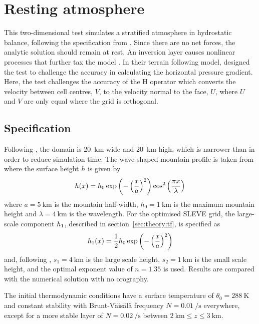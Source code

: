 \section{Resting atmosphere}
\label{sec:resting}

This two-dimensional test simulates a stratified atmosphere in hydrostatic balance, following the specification from \textcite{klemp2011}.  Since there are no net forces, the analytic solution should remain at rest.  An inversion layer causes nonlinear processes that further tax the model \autocite{good2013}.  In their terrain following model, \textcite{klemp2011} designed the test to challenge the accuracy in calculating the horizontal pressure gradient.  Here, the test challenges the accuracy of the H operator which converts the velocity between cell centres, $V$, to the velocity normal to the face, $U$, where $U$ and $V$ are only equal where the grid is orthogonal.

\subsection{Specification}
Following \textcite{weller-shahrokhi2014}, the domain is \SI{20}{\kilo\meter} wide and \SI{20}{\kilo\meter} high, which is narrower than \textcite{klemp2011} in order to reduce simulation time.  The wave-shaped mountain profile is taken from \textcite{schaer2002} where the surface height $h$ is given by
\begin{align}
	h(x) = h_0 \exp \left( - \left( \frac{x}{a} \right)^2 \right) \cos^2 \left( \frac{\pi x}{\lambda} \right) \label{eqn:resting:mountain}
\end{align}
where $a = \SI{5}{\kilo\meter}$ is the mountain half-width, $h_0 = \SI{1}{\kilo\meter}$ is the maximum mountain height and $\lambda = \SI{4}{\kilo\meter}$ is the wavelength.  For the optimised SLEVE grid, the large-scale component $h_1$, described in section~\ref{sec:theory:tf}, is specified as
\begin{align}
h_1(x) = \frac{1}{2} h_0 \exp \left( - \left( \frac{x}{a} \right)^2 \right)
\end{align}
and, following \cite{leuenberger2010}, $s_1 = \SI{4}{\kilo\meter}$ is the large scale height, $s_2 = \SI{1}{\kilo\meter}$ is the small scale height, and the optimal exponent value of $n = 1.35$ is used.  Results are compared with the numerical solution with no orography.

The initial thermodynamic conditions have a surface temperature of $\theta_0 = \SI{288}{\kelvin}$ and constant stability with Brunt-V\"ais\"al\"a frequency $N = \SI{0.01}{\per\second}$ everywhere, except for a more stable layer of $N = \SI{0.02}{\per\second}$ between $\SI{2}{\kilo\meter} \leq z \leq \SI{3}{\kilo\meter}$.

